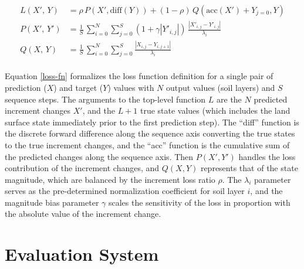 \begin{equation}\label{loss-fn}
    \begin{split}
        L(X',\,Y) &= \rho\,P(X',\text{diff}(Y)) + (1-\rho)\,Q(\text{acc}(X')+Y_{j=0},Y) \\
        P(X',\,Y') &= \frac{1}{S}\,\sum_{i=0}^N \sum_{j=0}^S (1+\gamma \left|Y'_{i,j}\right|)\,\frac{\left|X'_{i,j}-Y'_{i,j}\right|}{\lambda_i} \\
        Q(X,\,Y) &= \frac{1}{S}\,\sum_{i=0}^N \sum_{j=0}^S \frac{\left|X_{i,j}-Y_{i,j+1}\right|}{\lambda_i}\\
    \end{split}
\end{equation}


Equation \ref{loss-fn} formalizes the loss function definition for a single pair of prediction ($X$) and target ($Y$) values with $N$ output values (soil layers) and $S$ sequence steps. The arguments to the top-level function $L$ are the $N$ predicted increment changes $X'$, and the $L+1$ true state values (which includes the land surface state immediately prior to the first prediction step). The ``diff'' function is the discrete forward difference along the sequence axis converting the true states to the true increment changes, and the ``acc'' function is the cumulative sum of the predicted changes along the sequence axis. Then $P(X',Y')$ handles the loss contribution of the increment changes, and $Q(X,Y)$ represents that of the state magnitude, which are balanced by the increment loss ratio $\rho$. The $\lambda_i$ parameter serves as the pre-determined normalization coefficient for soil layer $i$, and the magnitude bias parameter $\gamma$ scales the sensitivity of the loss in proportion with the absolute value of the increment change.

\section{Evaluation System}

